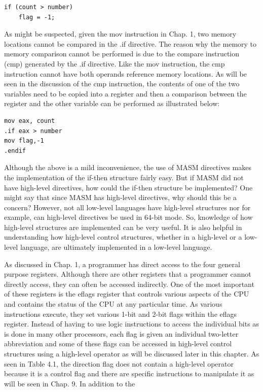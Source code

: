 \documentclass[10pt]{book}
\begin{document}
\begin{verbatim}
if (count > number)
    flag = -1;
\end{verbatim}

As might be suspected, given the mov instruction in Chap. 1, two memory locations cannot be compared in the .if directive. The reason why the memory to memory comparison cannot be performed is due to the compare instruction (cmp) generated by the .if directive. Like the mov instruction, the cmp instruction cannot have both operands reference memory locations. As will be seen in the discussion of the cmp instruction, the contents of one of the two variables need to be copied into a register and then a comparison between the register and the other variable can be performed as illustrated below:

\begin{verbatim}
mov eax, count
.if eax > number
mov flag,-1
.endif
\end{verbatim}

Although the above is a mild inconvenience, the use of MASM directives makes the implementation of the if-then structure fairly easy. But if MASM did not have high-level directives, how could the if-then structure be implemented? One might say that since MASM has high-level directives, why should this be a concern? However, not all low-level languages have high-level structures nor for example, can high-level directives be used in 64-bit mode. So, knowledge of how high-level structures are implemented can be very useful. It is also helpful in understanding how high-level control structures, whether in a high-level or a low-level language, are ultimately implemented in a low-level language.

As discussed in Chap. 1, a programmer has direct access to the four general purpose registers. Although there are other registers that a programmer cannot directly access, they can often be accessed indirectly. One of the most important of these registers is the eflags register that controls various aspects of the CPU and contains the status of the CPU at any particular time. As various instructions execute, they set various 1-bit and 2-bit flags within the eflags register. Instead of having to use logic instructions to access the individual bits as is done in many other processors, each flag is given an individual two-letter abbreviation and some of these flags can be accessed in high-level control structures using a high-level operator as will be discussed later in this chapter. As seen in Table 4.1, the direction flag does not contain a high-level operator because it is a control flag and there are specific instructions to manipulate it as will be seen in Chap. 9. In addition to the
\end{document}
